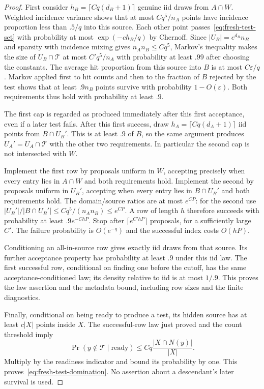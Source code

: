 \begin{proof}
First consider $h_B=\lceil Cq(d_B+1)\rceil$ genuine iid draws from
$A\cap W$.  Weighted incidence variance shows that at most
$Cq^5/n_A$ points have incidence proportion less than $.5/q$ into
this source.  Each other point passes~\eqref{eq:fresh-test-set} with
probability at most $\exp(-c h_B/q)$ by Chernoff.  Since
$|U_B|=e^{d_B}n_B$ and sparsity with incidence mixing gives
$n_An_B\le Cq^5$, Markov's inequality makes the size of
$U_B\cap\mathcal T$ at most $C'q^5/n_A$ with probability at least $.99$
after choosing the constants.
The average hit proportion from this source into $B$ is at most
$C\varepsilon/q$.  Markov applied first to hit counts and then to the
fraction of $B$ rejected by the test shows that at least $.9n_B$ points
survive with probability $1-O(\varepsilon)$.  Both requirements thus
hold with probability at least $.9$.

The first cap is regarded as produced immediately after this first
acceptance, even if a later test fails.  After this first success, draw
$h_A=\lceil Cq(d_A+1)\rceil$ iid points from $B\cap U_B'$.
This is at least $.9$ of $B$, so the same argument produces
$U_A'=U_A\cap\mathcal T$ with the other two requirements.  In
particular the second cap is not intersected with $W$.

Implement the first row by proposals uniform in $W$, accepting precisely
when every entry lies in $A\cap W$ and both requirements hold.
Implement the second by proposals uniform in $U_B'$, accepting when
every entry lies in $B\cap U_B'$ and both requirements hold.
The domain/source ratios are at most $e^{CP}$: for the second use
$|U_B'|/|B\cap U_B'|\le Cq^5/(n_An_B)\le e^{CP}$.
A row of length $h$ therefore succeeds with probability at least
$.9e^{-ChP}$.  Stop after $\lceil e^{C'hP}\rceil$ proposals, for a
sufficiently large $C'$.  The failure probability is $O(e^{-q})$ and
the successful index costs $O(hP)$.

Conditioning an all-in-source row gives exactly iid draws from that
source.  Its further acceptance property has probability at least $.9$
under this iid law.  The first successful row, conditional on finding
one before the cutoff, has the same acceptance-conditioned law; its
density relative to iid is at most $1/.9$.  This proves the law assertion
and the metadata bound, including row sizes and the finite diagnostics.

Finally, conditional on being ready to produce a test, its hidden source
has at least $c|X|$ points inside $X$.  The successful-row law just proved
and the count threshold imply
\[
 \Pr(y\notin\mathcal T\mid\text{ready})
 \le Cq\frac{|X\cap N(y)|}{|X|}.
\]
Multiply by the readiness indicator and bound its probability by one.
This proves~\eqref{eq:fresh-test-domination}.  No assertion about a
descendant's later survival is used.
\end{proof}

